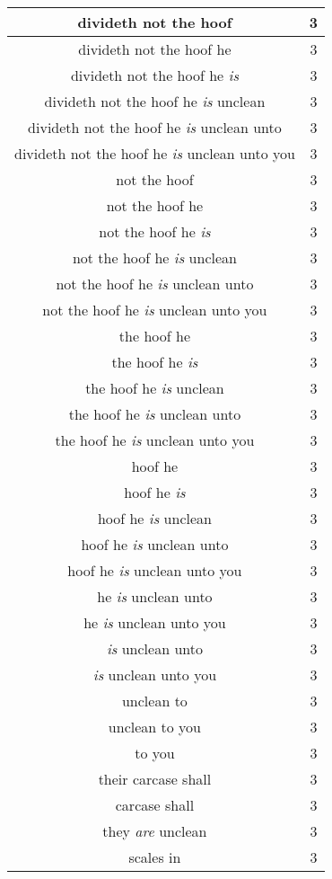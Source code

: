 \begin{center}
\begin{longtable}{|c|c|}
divideth not the hoof & 3\\ \hline 
divideth not the hoof he & 3\\ \hline 
divideth not the hoof he \emph{is} & 3\\ \hline 
divideth not the hoof he \emph{is} unclean & 3\\ \hline 
divideth not the hoof he \emph{is} unclean unto & 3\\ \hline 
divideth not the hoof he \emph{is} unclean unto you & 3\\ \hline 
not the hoof & 3\\ \hline 
not the hoof he & 3\\ \hline 
not the hoof he \emph{is} & 3\\ \hline 
not the hoof he \emph{is} unclean & 3\\ \hline 
not the hoof he \emph{is} unclean unto & 3\\ \hline 
not the hoof he \emph{is} unclean unto you & 3\\ \hline 
the hoof he & 3\\ \hline 
the hoof he \emph{is} & 3\\ \hline 
the hoof he \emph{is} unclean & 3\\ \hline 
the hoof he \emph{is} unclean unto & 3\\ \hline 
the hoof he \emph{is} unclean unto you & 3\\ \hline 
hoof he & 3\\ \hline 
hoof he \emph{is} & 3\\ \hline 
hoof he \emph{is} unclean & 3\\ \hline 
hoof he \emph{is} unclean unto & 3\\ \hline 
hoof he \emph{is} unclean unto you & 3\\ \hline 
he \emph{is} unclean unto & 3\\ \hline 
he \emph{is} unclean unto you & 3\\ \hline 
\emph{is} unclean unto & 3\\ \hline 
\emph{is} unclean unto you & 3\\ \hline 
unclean to & 3\\ \hline 
unclean to you & 3\\ \hline 
to you & 3\\ \hline 
their carcase shall & 3\\ \hline 
carcase shall & 3\\ \hline 
they \emph{are} unclean & 3\\ \hline 
scales in & 3\\ \hline 

\end{longtable}
\end{center}
